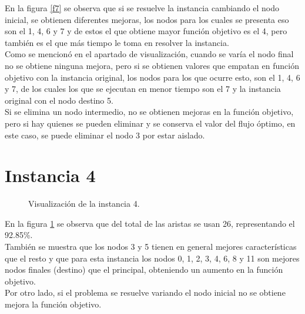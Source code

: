 \documentclass[12pt]{article}
\begin{document}
En la figura \ref{f7} se observa que si se resuelve la instancia cambiando el nodo inicial, se obtienen diferentes mejoras, los nodos para los cuales se presenta eso son el 1, 4, 6 y 7 y de estos el que obtiene mayor función objetivo es el 4, pero también es el que más tiempo le toma en resolver la instancia.   \\

Como se mencionó en el apartado de visualización, cuando se varía el nodo final no se obtiene ninguna mejora, pero si se obtienen valores que empatan en función objetivo con la instancia original, los nodos para los que ocurre esto, son el 1, 4, 6 y 7, de los cuales los que se ejecutan en menor tiempo son el 7 y la instancia original con el nodo destino 5. \\

Si se elimina un nodo intermedio, no se obtienen mejoras en la función objetivo, pero si hay quienes se pueden eliminar y se conserva el valor del flujo óptimo, en este caso, se puede eliminar el nodo 3 por estar aislado. 

\newpage
\section*{Instancia 4}

\begin{figure}[H]
\centering
{}

\caption{Visualización de la instancia 4.} \label{f8}
\end{figure}

En la figura \ref{f8} se observa que del total de las aristas se usan 26, representando el 92.85\%. \\

También se muestra que los nodos 3 y 5 tienen en general mejores características que el resto y que para esta instancia los nodos 0, 1, 2, 3, 4, 6, 8 y 11 son mejores nodos finales (destino) que el principal, obteniendo un aumento en la función objetivo. \\

Por otro lado, si el problema se resuelve variando el nodo inicial no se obtiene mejora la función objetivo.
\end{document}
